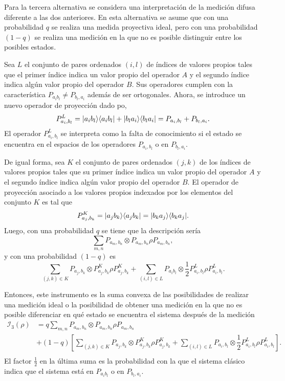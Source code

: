     Para la tercera alternativa se considera una interpretación de la medición difusa diferente a las dos anteriores. En esta alternativa se asume que con una probabilidad $q$ se realiza una medida proyectiva ideal, pero con una probabilidad $(1-q)$ se realiza una medición en la que no es posible distinguir entre los posibles estados.


    Sea $L$ el conjunto de pares ordenados $(i,l)$ de índices de  valores propios tales que el primer índice indica un valor propio del operador $A$ y el segundo índice indica algún valor propio del operador $B$. Sus operadores  cumplen con la característica $P_{a_i b_l}\ne P_{b_l, a_i}$ además de ser ortogonales. Ahora, se introduce un nuevo operador de proyección dado po,  \[P^{L}_{a_i,b_l}=|a_i b_l\rangle \langle a_i b_l|+|b_l a_i\rangle \langle b_l a_i|=P_{a_i,b_l}+P_{b_l,a_i}.\]El operador $P^L_{a_i,b_l}$ se interpreta como la falta de conocimiento si el estado se encuentra en el espacios de los operadores $P_{a_i,b_l}$ o en $P_{b_l, a_i}$. 

    De igual forma, sea $K$ el conjunto de pares ordenados $(j,k)$ de los índices de valores propios tales que su primer índice indica un valor propio del operador $A$ y el segundo índice indica algún valor propio del operador $B$.  El operador de proyección asociado a los valores propios indexados por los elementos del conjunto $K$ es tal que \[P^{K}_{a_j,b_k}=|a_j b_k\rangle \langle a_j b_k|=|b_k a_j \rangle \langle b_k a_j |.\] Luego, con una probabilidad $q$ se tiene que la descripción sería \[\sum_{m,n} P_{a_m,b_n}\otimes P_{a_m,b_n}\rho P_{a_m,b_n},\] y con una probabilidad $(1-q)$ es \[\sum_{(j,k)\in K} P_{a_j, b_k}\otimes  P^{K}_{a_j,b_k}\rho P^K_{a_j,b_k}+\sum_{(i,l) \in L}P_{a_i b_l} \otimes  \dfrac{1}{2}P^{L}_{a_i,b_l}\rho P^L_{a_i,b_l}.\]

     Entonces, este instrumento es la suma convexa de las posibilidades de realizar una medición ideal o la posibilidad de obtener una medición en la que no es posible diferenciar en qué estado se encuentra el sistema después de la medición\begin{equation}
        \begin{split}
            \mathcal{I}_3(\rho)&=q\sum_{m,n}  P_{a_m,b_n}\otimes P_{a_m,b_n}\rho P_{a_m,b_n}\\
            &+(1-q)\left[\sum_{(j,k)\in K}P_{a_j,b_k} \otimes P^{K}_{a_j,b_k}\rho P^{K}_{a_j,b_k}+\sum_{(i,l) \in L}P_{a_i,b_l} \otimes  \dfrac{1}{2}P^{L}_{a_i,b_l}\rho P^L_{a_i,b_l}\right].\\
        \end{split}
    \end{equation}El factor $\frac{1}{2}$ en la última suma es la probabilidad con la que el sistema clásico indica que el sistema está en $P_{a_i b_l}$ o en $P_{b_l,a_i}$. 
    













